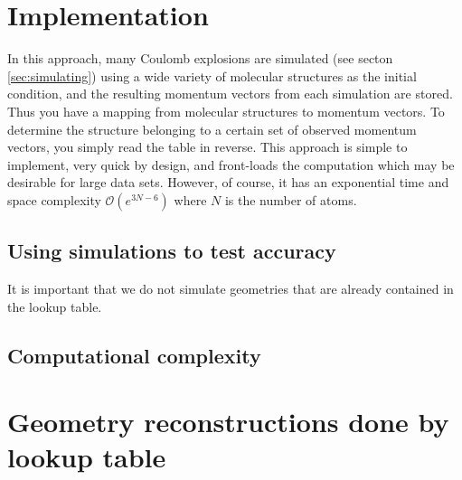 \section{Implementation}
In this approach, many Coulomb explosions are simulated (see secton \ref{sec:simulating}) using a wide variety of molecular structures as the initial condition, and the resulting momentum vectors from each simulation are stored. Thus you have a mapping from molecular structures to momentum vectors. To determine the structure belonging to a certain set of observed momentum vectors, you simply read the table in reverse. This approach is simple to implement, very quick by design, and front-loads the computation which may be desirable for large data sets. However, of course, it has an exponential time and space complexity $\mathcal{O}(e^{3N-6})$ where $N$ is the number of atoms.

\subsection{Using simulations to test accuracy}
It is important that we do not simulate geometries that are already contained in the lookup table.

\subsection{Computational complexity}

\section{Geometry reconstructions done by lookup table}

